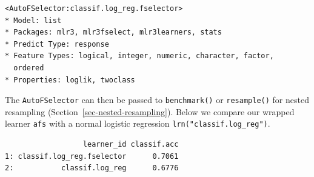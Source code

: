 \begin{Shaded}
\begin{Highlighting}[]
\OtherTok{=} \NormalTok{(}
   \NormalTok{(}\NormalTok{),}
   \NormalTok{(}\NormalTok{),}
   \NormalTok{(}\NormalTok{),}
   \NormalTok{(}\NormalTok{),}
   \NormalTok{(}\NormalTok{, } \NormalTok{)}
\NormalTok{)}
\end{Highlighting}
\end{Shaded}

\begin{verbatim}
<AutoFSelector:classif.log_reg.fselector>
* Model: list
* Packages: mlr3, mlr3fselect, mlr3learners, stats
* Predict Type: response
* Feature Types: logical, integer, numeric, character, factor,
  ordered
* Properties: loglik, twoclass
\end{verbatim}

The \texttt{AutoFSelector} can then be passed to \texttt{benchmark()} or
\texttt{resample()} for nested resampling
(Section~\ref{sec-nested-resampling}). Below we compare our wrapped
learner \texttt{afs} with a normal logistic regression
\texttt{lrn("classif.log\_reg")}.

\begin{Shaded}
\begin{Highlighting}[]
\OtherTok{=} \NormalTok{(}\NormalTok{(}\NormalTok{), }\NormalTok{(}\NormalTok{)),}
  \NormalTok{(}\NormalTok{, } \NormalTok{))}

\OtherTok{=} \SpecialCharTok{$}\NormalTok{(}\NormalTok{(}\NormalTok{))}
\end{Highlighting}
\end{Shaded}

\begin{verbatim}
                  learner_id classif.acc
1: classif.log_reg.fselector      0.7061
2:           classif.log_reg      0.6776
\end{verbatim}

